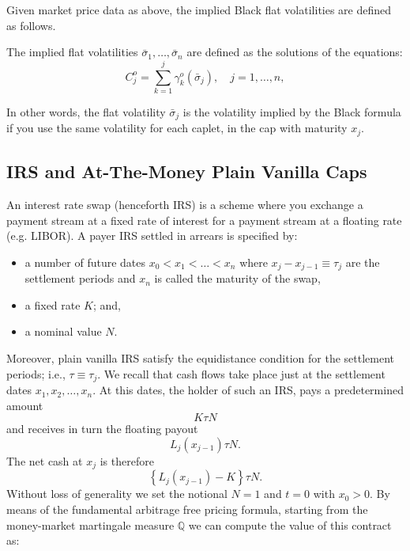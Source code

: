  Given market price data as above, the implied Black flat volatilities
 are defined as follows. 
\begin{defn}
The implied flat volatilities $\bar\sigma_1,\dots,\bar\sigma_n$ are
defined as the solutions of the equations: 
\begin{equation}
\label{FlatVols}
C^o_j = \sum_{k=1}^j \gamma^o_k(\bar\sigma_j), \quad j=1,\dots,n,
\end{equation}
\end{defn}
In other words, the flat volatility $\bar \sigma_j$ is the volatility
implied by the Black formula if you use the same volatility for each
caplet, in the cap with maturity $x_j$.
\subsection{IRS and At-The-Money Plain Vanilla Caps}
An interest rate swap (henceforth IRS) is a scheme where you exchange
a payment stream at a fixed rate of interest for a payment stream at a
floating rate (e.g. LIBOR). A payer IRS settled in arrears is
specified by: 
\begin{itemize}
\item a number of future dates $x_0 <x_1 <\dots < x_n$  where
  $x_j-x_{j-1}\equiv\tau_j$ are the settlement periods and $x_n$ is
  called the maturity of the swap, 
\item a fixed rate $K$; and,
\item a nominal value $N$.
\end{itemize}
Moreover, plain vanilla IRS satisfy the equidistance condition for the
settlement periods; i.e., $\tau \equiv \tau_j$. We recall that cash
flows take place just at the settlement dates $x_1, x_2, \dots,
x_n$. At this dates, the holder of such an IRS, pays a predetermined
amount $$K\tau N$$ and receives in turn the floating payout
$$L_j(x_{j-1})\tau N.$$ The net cash at $x_j$ is therefore 
$$
\left\{L_j(x_{j-1})-K\right\}\tau N.
$$
Without loss of generality we set the notional $N=1$ and $t=0$ with
$x_0>0$. By means of the fundamental arbitrage free pricing formula,
starting from the money-market martingale measure $\mathbb{Q}$ we can
compute the value of this contract as:

